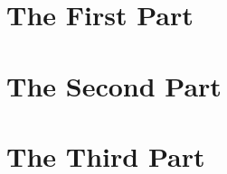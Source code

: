 





\setlength{\parindent}{0pt}
\setlength{\parskip}{0pt} %


\frontmatter



\setcounter{page}{0}





\cleardoublepage
{}
\tableofcontents

%
%


\setlength{\parskip}{1em}

\mainmatter



\part{The First Part}






\part{The Second Part}






\part{The Third Part}









